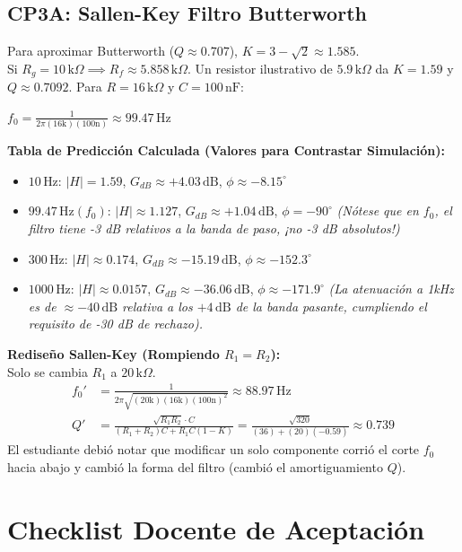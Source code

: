 \documentclass[11pt, a4paper]{article}
\begin{document}
\subsection*{CP3A: Sallen-Key Filtro Butterworth}
Para aproximar Butterworth ($Q \approx 0.707$), $K = 3 - \sqrt{2} \approx 1.585$. \\
Si $R_g=10\,\text{k}\Omega \implies R_f \approx 5.858\,\text{k}\Omega$. Un resistor ilustrativo de $5.9\,\text{k}\Omega$ da $K = 1.59$ y $Q \approx 0.7092$.
Para $R = 16\,\text{k}\Omega$ y $C = 100\,\text{nF}$:
{\centering $\displaystyle f_0 = \frac{1}{2\pi(16\text{k})(100\text{n})} \approx 99.47\,\text{Hz}$ \par}

\textbf{Tabla de Predicción Calculada (Valores para Contrastar Simulación):}
\begin{itemize}
    \item $10\,\text{Hz}$: $|H| = 1.59$, $G_{dB} \approx +4.03\,\text{dB}$, $\phi \approx -8.15^\circ$
    \item $99.47\,\text{Hz} (f_0)$: $|H| \approx 1.127$, $G_{dB} \approx +1.04\,\text{dB}$, $\phi = -90^\circ$ \textit{(Nótese que en $f_0$, el filtro tiene -3 dB relativos a la banda de paso, ¡no -3 dB absolutos!)}
    \item $300\,\text{Hz}$: $|H| \approx 0.174$, $G_{dB} \approx -15.19\,\text{dB}$, $\phi \approx -152.3^\circ$
    \item $1000\,\text{Hz}$: $|H| \approx 0.0157$, $G_{dB} \approx -36.06\,\text{dB}$, $\phi \approx -171.9^\circ$ \textit{(La atenuación a 1kHz es de $\approx-40\,\text{dB}$ relativa a los $+4\,\text{dB}$ de la banda pasante, cumpliendo el requisito de -30 dB de rechazo).}
\end{itemize}

\textbf{Rediseño Sallen-Key (Rompiendo $R_1=R_2$):} \\
Solo se cambia $R_1$ a $20\,\text{k}\Omega$.
\begin{align*}
    f_0' &= \frac{1}{2\pi \sqrt{(20\text{k})(16\text{k})(100\text{n})^2}} \approx 88.97\,\text{Hz} \\
    Q' &= \frac{\sqrt{R_1 R_2} \cdot C}{(R_1 + R_2)C + R_1 C (1-K)} = \frac{\sqrt{320}}{(36) + (20)(-0.59)} \approx 0.739
\end{align*}
El estudiante debió notar que modificar un solo componente corrió el corte $f_0$ hacia abajo y cambió la forma del filtro (cambió el amortiguamiento $Q$).

\newpage
\section*{Checklist Docente de Aceptación}
\end{document}
